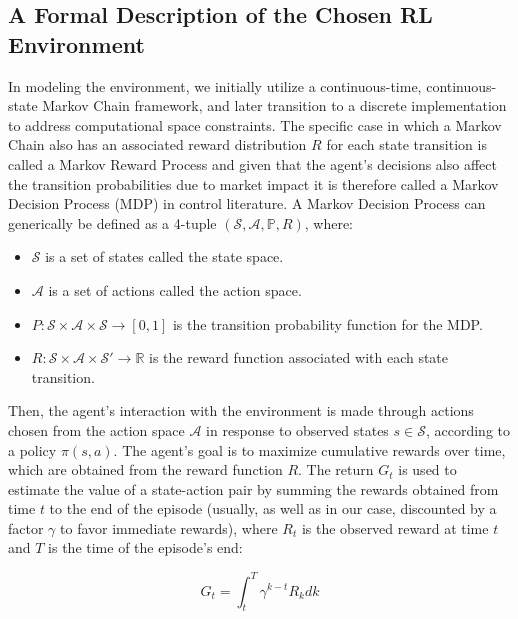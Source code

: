 \subsection{A Formal Description of the Chosen RL Environment}
\label{subsec:formal-description-of-the-rl-environment}
In modeling the environment, we initially utilize a continuous-time, continuous-state Markov Chain framework,
and later transition to a discrete implementation to address computational space constraints.
The specific case in which a Markov Chain also has an associated reward distribution $R$ for each state transition is called a Markov Reward Process
and given that the agent's decisions also affect the transition probabilities due to market impact it is therefore called a Markov Decision Process (MDP) in control literature.
A Markov Decision Process can generically be defined as a 4-tuple $ (\mathcal{S}, \mathcal{A}, \mathbb{P}, R) $, where:

\begin{itemize}
    \item $\mathcal{S}$ is a set of states called the state space.
    \item $\mathcal{A}$ is a set of actions called the action space.
    \item $P: \mathcal{S} \times \mathcal{A} \times \mathcal{S} \to [0, 1]$ is the transition probability function for the MDP.
    \item $R: \mathcal{S} \times \mathcal{A} \times \mathcal{S}' \rightarrow \mathbb{R}$ is the reward function associated with each state transition.
\end{itemize}

Then, the agent's interaction with the environment is made through actions chosen from the action space $\mathcal{A}$ in response to observed states $s \in \mathcal{S}$,
according to a policy $\pi (s, a)$.
The agent's goal is to maximize cumulative rewards over time, which are obtained from the reward function $R$.
The return $G_t$ is used to estimate the value of a state-action pair by summing the rewards obtained from time $t$ to the end of the episode (usually, as well as in our case,
discounted by a factor $\gamma$ to favor immediate rewards), where $R_{t}$ is the observed reward at time $t$ and $T$ is the time of the episode's end:

\[
    G_t = \int_{t}^{T} \gamma^{k-t} R_{k} dk
\]


